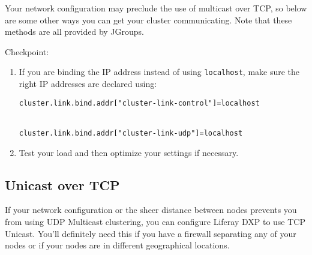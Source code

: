 Your network configuration may preclude the use of multicast over TCP,
so below are some other ways you can get your cluster communicating.
Note that these methods are all provided by JGroups.

Checkpoint:

\begin{enumerate}
\def\labelenumi{\arabic{enumi}.}
\item
  If you are binding the IP address instead of using \texttt{localhost},
  make sure the right IP addresses are declared using:

  \texttt{cluster.link.bind.addr{[}"cluster-link-control"{]}=localhost}\strut \\
  \texttt{cluster.link.bind.addr{[}"cluster-link-udp"{]}=localhost}
\item
  Test your load and then optimize your settings if necessary.
\end{enumerate}

\subsection{Unicast over TCP}\label{unicast-over-tcp}

If your network configuration or the sheer distance between nodes
prevents you from using UDP Multicast clustering, you can configure
Liferay DXP to use TCP Unicast. You'll definitely need this if you have
a firewall separating any of your nodes or if your nodes are in
different geographical locations.

